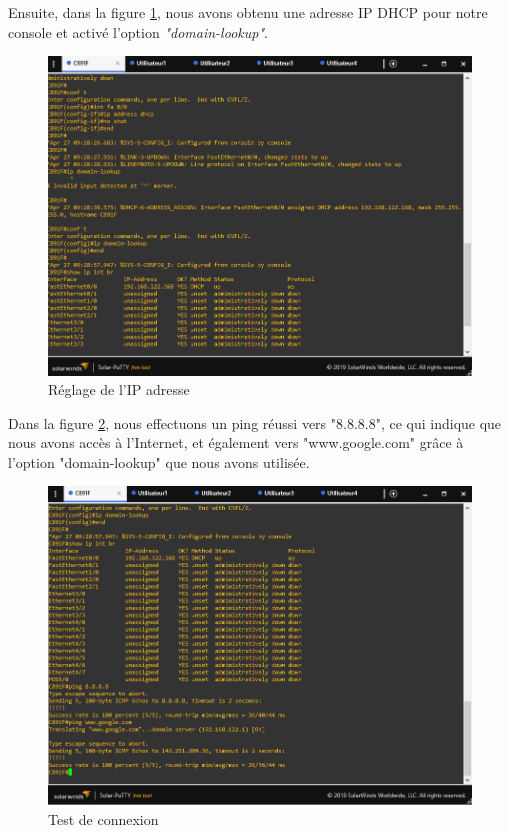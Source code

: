Ensuite, dans la figure \ref{Chap2.2.2}, nous avons obtenu une adresse IP DHCP pour notre console et activé l'option \textit{"domain-lookup"}. 


\begin{figure}[H]
 \centering
    \includegraphics[width=16cm]{Images/BRades-Topologie2.png}
    \caption{Réglage de l'IP adresse}
    \label{Chap2.2.2}
\end{figure}


Dans la figure \ref{Chap2.2.3}, nous effectuons un ping réussi vers "8.8.8.8", ce qui indique que nous avons accès à l'Internet, et également vers "www.google.com" grâce à l'option "domain-lookup" que nous avons utilisée.

\begin{figure}[H]
 \centering
    \includegraphics[width=16cm]{Images/BRades-Topologie3.png}
    \caption{Test de connexion}
    \label{Chap2.2.3}
\end{figure}

